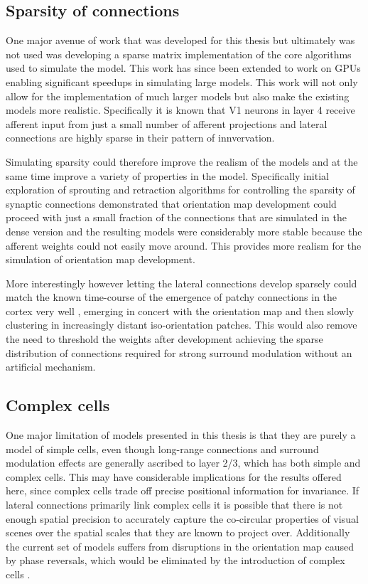 \subsection{Sparsity of connections}

One major avenue of work that was developed for this thesis but
ultimately was not used was developing a sparse matrix implementation
of the core algorithms used to simulate the model. This work has since
been extended to work on GPUs enabling significant speedups in
simulating large models. This work will not only allow for the
implementation of much larger models but also make the existing models
more realistic. Specifically it is known that V1 neurons in layer 4
receive afferent input from just a small number of afferent
projections and lateral connections are highly sparse in their pattern
of innvervation.

Simulating sparsity could therefore improve the realism of the models
and at the same time improve a variety of properties in the
model. Specifically initial exploration of sprouting and retraction
algorithms for controlling the sparsity of synaptic connections
demonstrated that orientation map development could proceed with just
a small fraction of the connections that are simulated in the dense
version and the resulting models were considerably more stable because
the afferent weights could not easily move around. This provides more
realism for the simulation of orientation map development.

More interestingly however letting the lateral connections develop
sparsely could match the known time-course of the emergence of patchy
connections in the cortex very well \citep{Ruthazer1996}, emerging in
concert with the orientation map and then slowly clustering in
increasingly distant iso-orientation patches. This would also remove
the need to threshold the weights after development achieving the
sparse distribution of connections required for strong surround
modulation without an artificial mechanism.

\subsection{Complex cells}

One major limitation of models presented in this thesis is that they
are purely a model of simple cells, even though long-range connections
and surround modulation effects are generally ascribed to layer 2/3,
which has both simple and complex cells. This may have considerable
implications for the results offered here, since complex cells trade
off precise positional information for invariance. If lateral
connections primarily link complex cells it is possible that there is
not enough spatial precision to accurately capture the co-circular
properties of visual scenes over the spatial scales that they are
known to project over. Additionally the current set of models suffers
from disruptions in the orientation map caused by phase reversals,
which would be eliminated by the introduction of complex cells
\citep{Antolik2010}.

